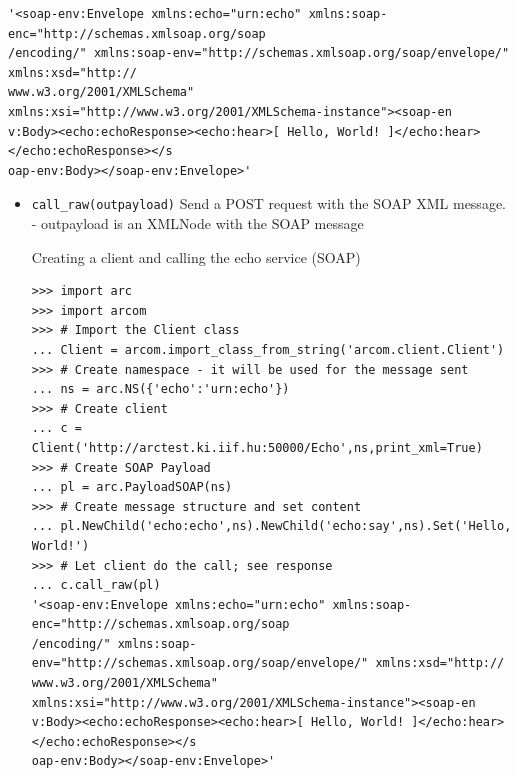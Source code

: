 \documentclass{article}
\begin{document}
\begin{flushleft}
\begin{itemize}
{\begin{example}
\begin{verbatim}
'<soap-env:Envelope xmlns:echo="urn:echo" xmlns:soap-enc="http://schemas.xmlsoap.org/soap
/encoding/" xmlns:soap-env="http://schemas.xmlsoap.org/soap/envelope/" xmlns:xsd="http://
www.w3.org/2001/XMLSchema" xmlns:xsi="http://www.w3.org/2001/XMLSchema-instance"><soap-en
v:Body><echo:echoResponse><echo:hear>[ Hello, World! ]</echo:hear></echo:echoResponse></s
oap-env:Body></soap-env:Envelope>'
\end{verbatim}
    \end{example}
  }
\end{itemize}
\begin{itemize}
  \item{ \verb$call_raw(outpayload)$\newline
  Send a POST request with the SOAP XML message.\newline
  - outpayload is an XMLNode with the SOAP message
    \begin{example}
      \caption{Creating a client and calling the echo service (SOAP)}\label{clientex2}
\begin{verbatim}
>>> import arc
>>> import arcom
>>> # Import the Client class
... Client = arcom.import_class_from_string('arcom.client.Client')
>>> # Create namespace - it will be used for the message sent
... ns = arc.NS({'echo':'urn:echo'})
>>> # Create client
... c = Client('http://arctest.ki.iif.hu:50000/Echo',ns,print_xml=True)
>>> # Create SOAP Payload
... pl = arc.PayloadSOAP(ns)
>>> # Create message structure and set content
... pl.NewChild('echo:echo',ns).NewChild('echo:say',ns).Set('Hello, World!')
>>> # Let client do the call; see response
... c.call_raw(pl)
'<soap-env:Envelope xmlns:echo="urn:echo" xmlns:soap-enc="http://schemas.xmlsoap.org/soap
/encoding/" xmlns:soap-env="http://schemas.xmlsoap.org/soap/envelope/" xmlns:xsd="http://
www.w3.org/2001/XMLSchema" xmlns:xsi="http://www.w3.org/2001/XMLSchema-instance"><soap-en
v:Body><echo:echoResponse><echo:hear>[ Hello, World! ]</echo:hear></echo:echoResponse></s
oap-env:Body></soap-env:Envelope>'
\end{verbatim}
    \end{example}
  }
\end{itemize}
\end{flushleft}
\end{document}
